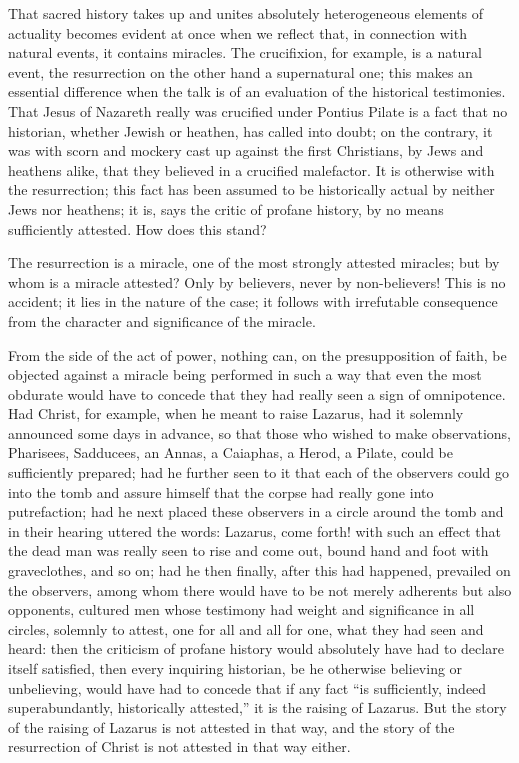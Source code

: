 \documentclass[12pt]{book}
\newcommand{\opage}[1]{\marginnote{\footnotesize\textit{[#1]}}}
\begin{document}
That sacred history takes up and unites absolutely heterogeneous elements
of actuality becomes evident at once when we reflect that, in connection
with natural events, it contains miracles. The crucifixion, for example,
is a natural
\opage{307}\setcounter{footnote}{0}%
event, the resurrection on the other hand a supernatural one; this makes
an essential difference when the talk is of an evaluation of the
historical testimonies. That Jesus of Nazareth really was crucified under
Pontius Pilate is a fact that no historian, whether Jewish or heathen, has
called into doubt; on the contrary, it was with scorn and mockery cast up
against the first Christians, by Jews and heathens alike, that they
believed in a crucified malefactor. It is otherwise with the resurrection;
this fact has been assumed to be historically actual by neither Jews nor
heathens; it is, says the critic of profane history, by no means
sufficiently attested. How does this stand?

The resurrection is a miracle, one of the most strongly attested miracles;
but by whom is a miracle attested? Only by believers, never by
non-believers! This is no accident; it lies in the nature of the case; it
follows with irrefutable consequence from the character and significance
of the miracle.

From the side of the act of power, nothing can, on the presupposition of
faith, be objected against a miracle being performed in such a way that
even the most obdurate would have to concede that they had really seen a
sign of omnipotence. Had Christ, for example, when he meant to raise
Lazarus, had it solemnly announced some days in advance, so that those who
wished to make observations, Pharisees, Sadducees, an Annas, a Caiaphas, a
Herod, a Pilate, could be sufficiently prepared; had he further seen to it
that each of the observers could go into the tomb and assure himself that
the corpse had really gone into putrefaction; had he next placed these
observers in a circle around the tomb and in their hearing uttered the
words: Lazarus, come forth! with such an effect that the dead man was
really seen to rise and come out, bound hand and foot with graveclothes,
and so on; had he then finally, after this had happened, prevailed on the
observers, among whom there would have to be not merely adherents but also
opponents, cultured
\opage{308}\setcounter{footnote}{0}%
men whose testimony had weight and significance in all circles, solemnly
to attest, one for all and all for one, what they had seen and heard: then
the criticism of profane history would absolutely have had to declare
itself satisfied, then every inquiring historian, be he otherwise
believing or unbelieving, would have had to concede that if any fact ``is
sufficiently, indeed superabundantly, historically attested,'' it is the
raising of Lazarus. But the story of the raising of Lazarus is not
attested in that way, and the story of the resurrection of Christ is not
attested in that way either.
\end{document}
